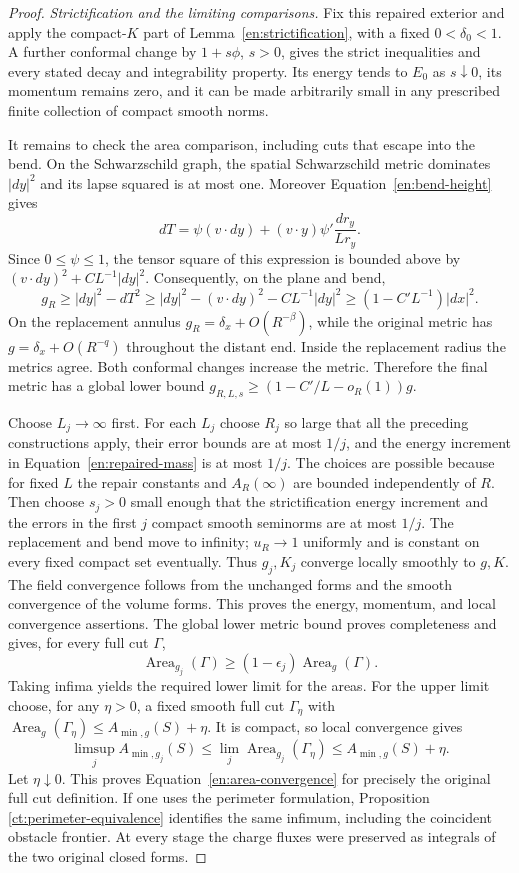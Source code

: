 \begin{proof}
\emph{Strictification and the limiting comparisons.}
Fix this repaired exterior and apply the compact-$K$ part of
Lemma~\ref{en:strictification}, with a fixed
$0<\delta_0<1$. A further conformal change by $1+s\phi$, $s>0$,
gives the strict inequalities and every stated decay and
integrability property. Its energy tends to $E_0$ as $s\downarrow0$,
its momentum remains zero, and it can be made arbitrarily small
in any prescribed finite collection of compact smooth norms.

It remains to check the area comparison, including cuts that escape
into the bend. On the Schwarzschild graph, the spatial Schwarzschild
metric dominates $|dy|^2$ and its lapse squared is at most one.
Moreover Equation~\ref{en:bend-height} gives
\[
 dT=\psi(v\cdot dy)
        +(v\cdot y)\psi'\frac{dr_y}{Lr_y}.
\]
Since $0\leq\psi\leq1$, the tensor square of this expression is
bounded above by $(v\cdot dy)^2+C L^{-1}|dy|^2$.
Consequently, on the plane and bend,
\begin{equation}\label{en:bend-metric-domination}
 g_R\geq|dy|^2-dT^2
 \geq |dy|^2-(v\cdot dy)^2-C L^{-1}|dy|^2
 \geq(1-C' L^{-1})|dx|^2.
\end{equation}
On the replacement annulus $g_R=\delta_x+O(R^{-\beta})$,
while the original metric has $g=\delta_x+O(R^{-q})$ throughout
the distant end. Inside the replacement radius the metrics agree.
Both conformal changes increase the metric. Therefore the final
metric has a global lower bound
$g_{R,L,s}\geq(1-C'/L-o_R(1))g$.

Choose $L_j\to\infty$ first. For each $L_j$ choose $R_j$ so
large that all the preceding constructions apply, their error
bounds are at most $1/j$, and the energy increment in
Equation~\ref{en:repaired-mass} is at most $1/j$.
The choices are possible because for fixed $L$ the repair constants
and $A_R(\infty)$ are bounded independently of $R$.
Then choose $s_j>0$ small enough that the strictification energy
increment and the errors in the first $j$ compact smooth seminorms
are at most $1/j$. The replacement and bend move to infinity;
$u_R\to1$ uniformly and is constant on every fixed compact set
eventually. Thus $g_j,K_j$ converge locally smoothly to $g,K$.
The field convergence follows from the unchanged forms and the
smooth convergence of the volume forms. This proves the energy,
momentum, and local convergence assertions. The global lower metric
bound proves completeness and gives, for every full cut $\Gamma$,
\[
 \operatorname{Area}_{g_j}(\Gamma)
       \geq(1-\epsilon_j)\operatorname{Area}_g(\Gamma).
\]
Taking infima yields the required lower limit for the areas.
For the upper limit choose, for any $\eta>0$, a fixed smooth full
cut $\Gamma_\eta$ with
$\operatorname{Area}_g(\Gamma_\eta)\leq A_{\min,g}(S)+\eta$.
It is compact, so local convergence gives
\[
 \limsup_j A_{\min,g_j}(S)
 \leq\lim_j\operatorname{Area}_{g_j}(\Gamma_\eta)
 \leq A_{\min,g}(S)+\eta.
\]
Let $\eta\downarrow0$. This proves
Equation~\ref{en:area-convergence} for precisely the original full
cut definition. If one uses the perimeter formulation, Proposition
\ref{ct:perimeter-equivalence} identifies the same infimum, including
the coincident obstacle frontier. At every stage the charge fluxes
were preserved as integrals of the two original closed forms.
\end{proof}
